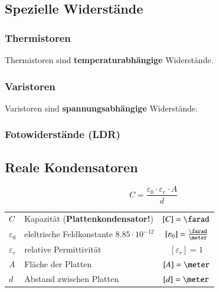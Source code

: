 \subsection{Spezielle Widerstände}

\subsubsection{Thermistoren}

Thermistoren sind \textbf{temperaturabhängige} Widerstände.


\begin{minipage}[c]{0.48\columnwidth}
\end{minipage}
\hfill
\begin{minipage}[c]{0.48\columnwidth}
\end{minipage}


\subsubsection{Varistoren}

Varistoren sind \textbf{spannungsabhängige} Widerstände.


\subsubsection{Fotowiderstände (LDR)}






\subsection{Reale Kondensatoren}

\begin{minipage}[c]{0.20\columnwidth}
    $$ \boxed{C = \frac{\varepsilon_0 \cdot \varepsilon_r \cdot A}{d}} $$
\end{minipage}
\hfill
\begin{minipage}[c]{0.78\columnwidth}
    \begin{tabular}{llc}
        $C$             & Kapazität (\textbf{Plattenkondensator!})          & $[C] = \farad$ \\
        $\varepsilon_0$ & eleltrische Feldkonstante $8.85 \cdot 10^{-12}$   & $[\varepsilon_0] = \frac{\farad}{\meter}$ \\
        $\varepsilon_r$ & relative Permittivität                            & $[\varepsilon_r] = 1$ \\
        $A$             & Fläche der Platten                                & $[A] = \meter$ \\
        $d$             & Abstand zwischen Platten                          & $[d] = \meter$

    \end{tabular}
\end{minipage}


